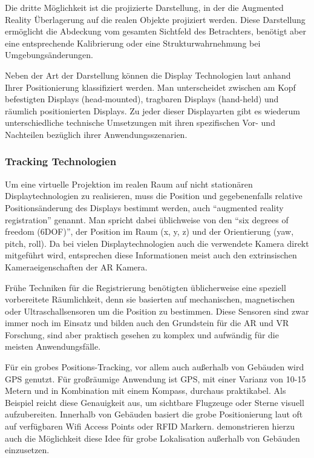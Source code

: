 Die dritte Möglichkeit ist die projizierte Darstellung, in der die Augmented Reality Überlagerung auf die realen Objekte projiziert werden. Diese Darstellung ermöglicht die Abdeckung vom gesamten Sichtfeld des Betrachters, benötigt aber eine entsprechende Kalibrierung oder eine Strukturwahrnehmung bei Umgebungsänderungen.

Neben der Art der Darstellung können die Display Technologien laut \citet{azuma2001recent} anhand Ihrer Positionierung klassifiziert werden. Man unterscheidet zwischen am Kopf befestigten Displays (head-mounted), tragbaren Displays (hand-held) und räumlich positionierten Displays. Zu jeder dieser Displayarten gibt es wiederum unterschiedliche technische Umsetzungen mit ihren spezifischen Vor- und Nachteilen bezüglich ihrer Anwendungsszenarien.

\subsubsection{Tracking Technologien}

Um eine virtuelle Projektion im realen Raum auf nicht stationären Displaytechnologien zu realisieren, muss die Position und gegebenenfalls relative Positionsänderung des Displays bestimmt werden, auch \enquote{augmented reality registration} genannt. Man spricht dabei üblichweise von den \enquote{six degrees of freedom (6DOF)}, der Position im Raum (x, y, z) und der Orientierung (yaw, pitch, roll). Da bei vielen Displaytechnologien auch die verwendete Kamera direkt mitgeführt wird, entsprechen diese Informationen meist auch den extrinsischen Kameraeigenschaften der AR Kamera.

Frühe Techniken für die Registrierung benötigten üblicherweise eine speziell vorbereitete Räumlichkeit, denn sie basierten auf mechanischen, magnetischen oder Ultraschallsensoren um die Position zu bestimmen. Diese Sensoren sind zwar immer noch im Einsatz und bilden auch den Grundstein für die AR und VR Forschung, sind aber praktisch gesehen zu komplex und aufwändig für die meisten Anwendungsfälle. \citep{van2010survey} 

Für ein grobes Positions-Tracking, vor allem auch außerhalb von Gebäuden wird GPS genutzt. Für großräumige Anwendung ist GPS, mit einer Varianz von 10-15 Metern und in Kombination mit einem Kompass, durchaus praktikabel. Als Beispiel reicht diese Genauigkeit aus, um sichtbare Flugzeuge oder Sterne visuell aufzubereiten. Innerhalb von Gebäuden basiert die grobe Positionierung laut \citet{van2010survey} oft auf verfügbaren Wifi Access Points oder RFID Markern. \citet{lamarca2005place} demonstrieren hierzu auch die Möglichkeit diese Idee für grobe Lokalisation außerhalb von Gebäuden einzusetzen.

